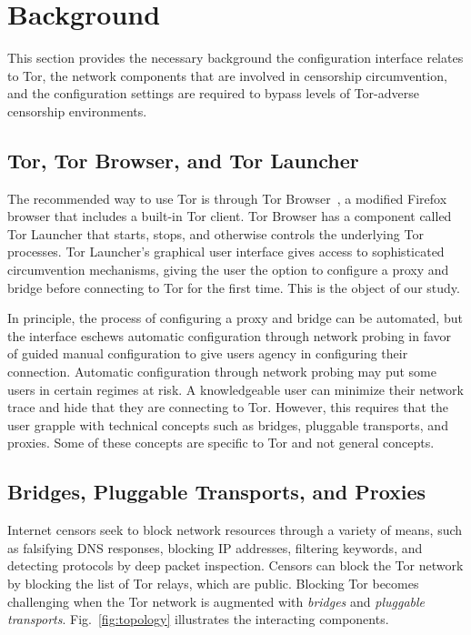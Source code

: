 \documentclass[USenglish,oneside,twocolumn]{article}
\begin{document}
\section{Background}
This section provides the necessary background the configuration interface relates to Tor, the network components that are involved in censorship circumvention, and the configuration settings are required to bypass levels of Tor-adverse censorship environments. 

\subsection{Tor, Tor Browser, and Tor Launcher}
The recommended way to use Tor is through Tor Browser~\cite{torbrowser},
a modified Firefox browser that includes a built-in Tor client.
Tor Browser has a component called Tor Launcher that
starts, stops, and otherwise controls the underlying Tor processes.
Tor Launcher's graphical user interface gives access to 
sophisticated circumvention mechanisms, giving the user
the option to configure a proxy and bridge before connecting to Tor
for the first time. This is the object of our study. 

In principle, the process of configuring a proxy and bridge can be automated, but
the interface eschews automatic configuration through network probing
in favor of guided manual configuration to give users agency in configuring their connection. 
Automatic configuration through network probing may put some users in certain regimes at risk. 
A knowledgeable user can minimize their network trace and hide that they are connecting to Tor.
However, this requires that the user grapple with technical concepts such as 
bridges, pluggable transports, and proxies. Some of these concepts are specific to 
Tor and not general concepts.

\subsection{Bridges, Pluggable Transports, and Proxies} 
Internet censors seek to block network resources through 
a variety of means, such as falsifying DNS responses, blocking IP addresses, 
filtering keywords, and detecting protocols by deep packet inspection.
Censors can block the Tor network by blocking the list of Tor relays, which 
are public. Blocking Tor becomes challenging when
the Tor network is augmented with \emph{bridges} and \emph{pluggable transports}.
Fig.~\ref{fig:topology} illustrates the interacting components.
\end{document}
